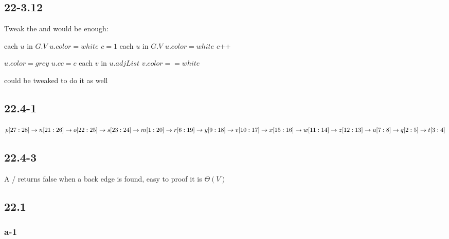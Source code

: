 \documentclass[]{article}
\begin{document}
\subsection{22-3.12}

Tweak the  and  would be enough:

\begin{codebox}
	
	\li	\For each $u$ in $G.V$
	\li \Do $u.color = white$
	\End
	\li $c=1$
	\li	\For each $u$ in $G.V$
	\li \Do \If $u.color = white$
	\li \Then {}
	\li $c$++
	\End
	\End
	
\end{codebox}

\begin{codebox}
	
	\li $u.color = grey$
	\li $u.cc = c$
	\li	\For each $v$ in $u.adjList$
	\li \Do \If $v.color == white$
	\li 	\Then {}
	\End
	\End
	
\end{codebox}

 could be tweaked to do it as well

\subsection{22.4-1}

$ p[27:28] \rightarrow n[21:26] \rightarrow o[22:25] \rightarrow s[23:24] \rightarrow\\
 m[1:20] \rightarrow r[6:19] \rightarrow y[9:18] \rightarrow v[10:17] \rightarrow x[15:16] \rightarrow \\
w[11:14] \rightarrow z[12:13] \rightarrow u[7:8] \rightarrow q[2:5] \rightarrow t[3:4]$

\subsection{22.4-3}
A / returns false when a back edge is found, easy to proof it is $\Theta (V)$

\subsection{22.1}
\subsubsection{a-1}
\end{document}
